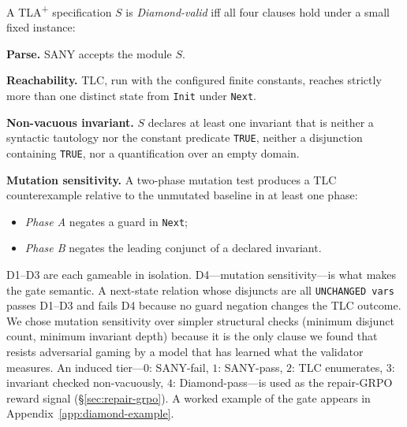 \documentclass[11pt]{article}
\begin{document}
\begin{tcolorbox}[
  enhanced, breakable,
  colback=cbox, colframe=cline, boxrule=0.5pt,
  arc=2pt, left=8pt, right=8pt, top=4pt, bottom=4pt,
  title=\textbf{Definition (Diamond gate).}, fonttitle=\small,
]
A TLA\textsuperscript{+} specification $S$ is \emph{Diamond-valid}
iff all four clauses hold under a small fixed instance:
\begin{description}[leftmargin=1.4em, itemsep=1pt]
\item[\textbf{D1.}] \textbf{Parse.}  SANY accepts the module $S$.
\item[\textbf{D2.}] \textbf{Reachability.}  TLC, run with the
  configured finite constants, reaches strictly more than one distinct
  state from \texttt{Init} under \texttt{Next}.
\item[\textbf{D3.}] \textbf{Non-vacuous invariant.}  $S$ declares at
  least one invariant that is neither a syntactic tautology nor the
  constant predicate \texttt{TRUE}, neither a disjunction containing
  \texttt{TRUE}, nor a quantification over an empty domain.
\item[\textbf{D4.}] \textbf{Mutation sensitivity.}  A two-phase
  mutation test produces a TLC counterexample relative to the
  unmutated baseline in at least one phase:
  \begin{itemize}[leftmargin=1.2em, itemsep=0pt]
    \item \emph{Phase A} negates a guard in \texttt{Next};
    \item \emph{Phase B} negates the leading conjunct of a declared
      invariant.
  \end{itemize}
\end{description}
\end{tcolorbox}

\noindent D1--D3 are each gameable in isolation.  D4---mutation
sensitivity---is what makes the gate semantic.  A next-state relation
whose disjuncts are all \texttt{UNCHANGED vars} passes D1--D3 and
fails D4 because no guard negation changes the TLC outcome.  We chose
mutation sensitivity over simpler structural checks (minimum disjunct
count, minimum invariant depth) because it is the only clause we
found that resists adversarial gaming by a model that has learned what
the validator measures.  An induced tier---$0$: SANY-fail, $1$:
SANY-pass, $2$: TLC enumerates, $3$: invariant checked non-vacuously,
$4$: Diamond-pass---is used as the repair-GRPO reward signal
(\S\ref{sec:repair-grpo}).  A worked example of the gate appears in
Appendix~\ref{app:diamond-example}.
\end{document}
